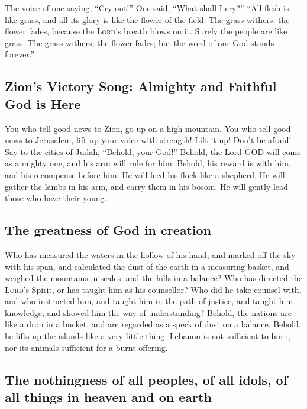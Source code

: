  The voice of one saying, ``Cry out!'' One said, ``What
shall I cry?'' ``All flesh is like grass, and all its glory is like the
flower of the field.  The grass withers, the flower fades,
because the \textsc{Lord}'s breath blows on it. Surely the people are
like grass.  The grass withers, the flower fades; but the
word of our God stands forever.''

\hypertarget{zions-victory-song-almighty-and-faithful-god-is-here}{%
\subsection{Zion's Victory Song: Almighty and Faithful God is
Here}\label{zions-victory-song-almighty-and-faithful-god-is-here}}

 You who tell good news to Zion, go up on a high mountain.
You who tell good news to Jerusalem, lift up your voice with strength!
Lift it up! Don't be afraid! Say to the cities of Judah, ``Behold, your
God!''  Behold, the Lord GOD will come as a mighty one,
and his arm will rule for him. Behold, his reward is with him, and his
recompense before him.  He will feed his flock like a
shepherd. He will gather the lambs in his arm, and carry them in his
bosom. He will gently lead those who have their young.

\hypertarget{the-greatness-of-god-in-creation}{%
\subsection{The greatness of God in
creation}\label{the-greatness-of-god-in-creation}}

 Who has measured the waters in the hollow of his hand,
and marked off the sky with his span, and calculated the dust of the
earth in a measuring basket, and weighed the mountains in scales, and
the hills in a balance?  Who has directed the
\textsc{Lord}'s Spirit, or has taught him as his counsellor?
 Who did he take counsel with, and who instructed him,
and taught him in the path of justice, and taught him knowledge, and
showed him the way of understanding?  Behold, the nations
are like a drop in a bucket, and are regarded as a speck of dust on a
balance. Behold, he lifts up the islands like a very little thing.
 Lebanon is not sufficient to burn, nor its animals
sufficient for a burnt offering.

\hypertarget{the-nothingness-of-all-peoples-of-all-idols-of-all-things-in-heaven-and-on-earth}{%
\subsection{The nothingness of all peoples, of all idols, of all things
in heaven and on
earth}\label{the-nothingness-of-all-peoples-of-all-idols-of-all-things-in-heaven-and-on-earth}}

